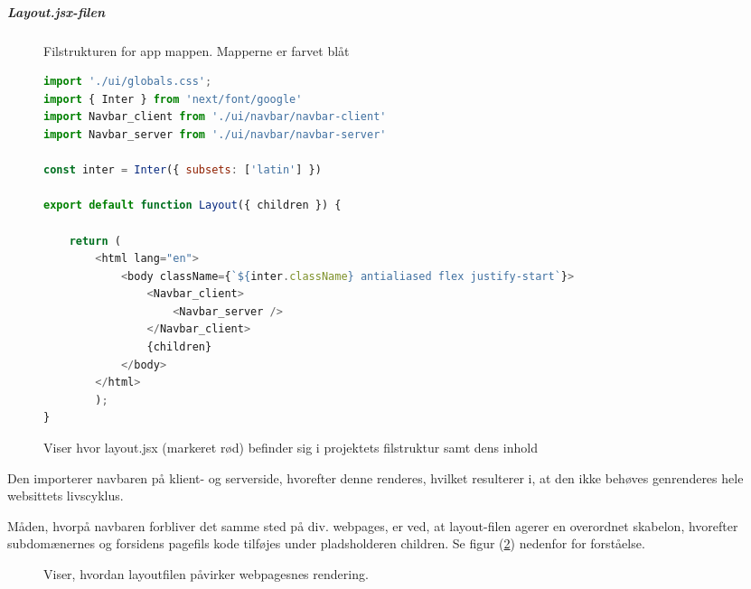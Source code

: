             \subparagraph{Layout.jsx-filen}
            \begin{figure}[H]
                \caption{Filstrukturen for app mappen. Mapperne er farvet blåt}
                \begin{lstlisting}[language=Javascript]
import './ui/globals.css';
import { Inter } from 'next/font/google'
import Navbar_client from './ui/navbar/navbar-client'
import Navbar_server from './ui/navbar/navbar-server'

const inter = Inter({ subsets: ['latin'] })

export default function Layout({ children }) {

    return ( 
        <html lang="en">
            <body className={`${inter.className} antialiased flex justify-start`}>
                <Navbar_client>
                    <Navbar_server />
                </Navbar_client>
                {children}
            </body>
        </html> 
        );
}
                \end{lstlisting}
                \caption{Viser hvor layout.jsx (markeret rød) befinder sig i projektets filstruktur samt dens inhold \label{fig:layout}}
            \end{figure}
            Den importerer navbaren på klient- og serverside, hvorefter denne renderes, hvilket resulterer i, at den ikke behøves genrenderes hele websittets livscyklus.

            Måden, hvorpå navbaren forbliver det samme sted på div. webpages, er ved, at layout-filen agerer en overordnet skabelon, hvorefter subdomænernes og forsidens pagefils kode tilføjes under pladsholderen {children}.
            Se figur (\ref{fig:layoutforståelse}) nedenfor for forståelse.

            \begin{figure}[H]
                \centering
                \caption{Viser, hvordan layoutfilen påvirker webpagesnes rendering. \label{fig:layoutforståelse}}
            \end{figure}

